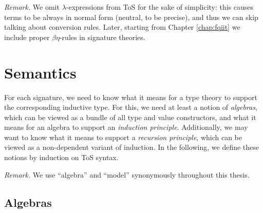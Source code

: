 \documentclass[12pt,a4paper,twoside,openany]{book}
\theoremstyle{remark}
\theoremstyle{definition}
\theoremstyle{theorem}
\begin{document}
\emph{Remark.} We omit $\lambda$-expressions from ToS for the sake of
simplicity: this causes terms to be always in normal form (neutral, to be
precise), and thus we can skip talking about conversion rules. Later, starting
from Chapter \ref{chap:fqiit} we include proper $\beta\eta$-rules in signature
theories.

\section{Semantics}
\label{sec:simple-semantics}

For each signature, we need to know what it means for a type theory to support
the corresponding inductive type. For this, we need at least a notion of
\emph{algebras}, which can be viewed as a bundle of all type and
value constructors, and what it means for an algebra to support an
\emph{induction principle}.  Additionally, we may want to know what it means to
support a \emph{recursion principle}, which can be viewed as a non-dependent
variant of induction. In the following, we define these notions by induction on
ToS syntax.

\emph{Remark.} We use ``algebra'' and ``model'' synonymously throughout
this thesis.

\subsection{Algebras}
\end{document}
